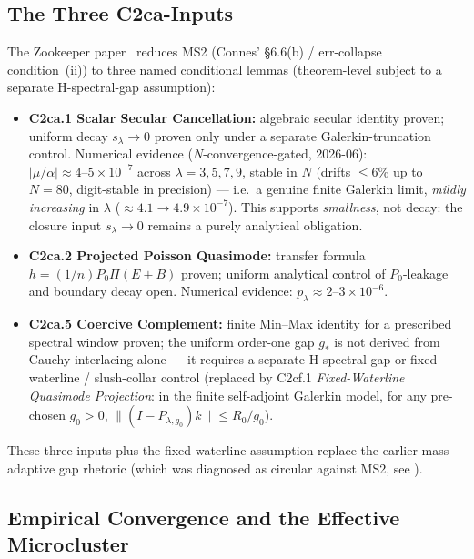 \documentclass[12pt,a4paper]{article}
\theoremstyle{definition}
\theoremstyle{remark}
\begin{document}
\subsection{The Three C2ca-Inputs}
\label{sec:c2ca-inputs}

The Zookeeper paper~\cite{Geiger2026zookeeper} reduces
MS2 (Connes' \S6.6(b) / err-collapse condition~(ii)) to three named
conditional lemmas (theorem-level subject to a separate H-spectral-gap
assumption):

\begin{itemize}
  \item \textbf{C2ca.1 Scalar Secular Cancellation:} algebraic secular
    identity proven; uniform decay $s_\lambda \to 0$ proven only under a
    separate Galerkin-truncation control. Numerical evidence
    ($N$-convergence-gated, 2026-06): $|\mu/\alpha|\approx
    4\text{--}5\times 10^{-7}$ across $\lambda = 3,5,7,9$, stable in $N$
    (drifts $\le 6\%$ up to $N{=}80$, digit-stable in precision) ---
    i.e.\ a genuine finite Galerkin limit, \emph{mildly increasing} in
    $\lambda$ ($\approx 4.1 \to 4.9 \times 10^{-7}$). This supports
    \emph{smallness}, not decay: the closure input $s_\lambda \to 0$
    remains a purely analytical obligation.
  \item \textbf{C2ca.2 Projected Poisson Quasimode:} transfer formula
    $h = (1/n)P_0\Pi(E+B)$ proven; uniform analytical control of
    $P_0$-leakage and boundary decay open. Numerical evidence:
    $p_\lambda \approx 2\text{--}3\times 10^{-6}$.
  \item \textbf{C2ca.5 Coercive Complement:} finite Min--Max identity
    for a prescribed spectral window proven; the uniform order-one gap
    $g_*$ is not derived from Cauchy-interlacing alone --- it requires a
    separate H-spectral gap or fixed-waterline / slush-collar control
    (replaced by C2cf.1 \emph{Fixed-Waterline Quasimode Projection}: in
    the finite self-adjoint Galerkin model, for any pre-chosen $g_0>0$,
    $\|(I-P_{\lambda,g_0})k\|\leq R_0/g_0$).
\end{itemize}

These three inputs plus the fixed-waterline assumption replace the
earlier mass-adaptive gap rhetoric (which was diagnosed as circular
against MS2, see ).


\subsection{Empirical Convergence and the Effective Microcluster}
\label{sec:branch-z-empirics}
\end{document}
